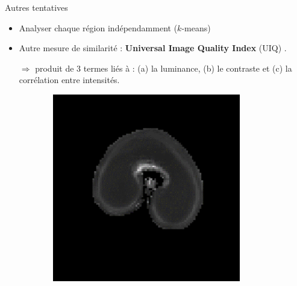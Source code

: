 \documentclass[10pt]{beamer}
\begin{document}
\begin{frame}{Autres tentatives}

  

  \begin{itemize}
  \item Analyser chaque région indépendamment ($k$-means)
  \item  Autre mesure de similarité : \textbf{Universal Image Quality Index} (UIQ) \cite{Zhou_Wang_2002}.
    
  $\Rightarrow$ produit de 3 termes liés à : (a) la luminance, (b) le contraste et (c) la corrélation entre intensités.
\end{itemize}

    \begin{figure}[ht]
    \centering
    \begin{subfigure}[t]{0.31\textwidth}
      \centering
      \includegraphics[width=0.9\textwidth]{fig/mri_slice8_250}
      \caption{}
      \label{subfig:mri_slice8_250}
    \end{subfigure}%
    \begin{subfigure}[t]{0.31\textwidth}
      \centering

\end{subfigure}
\end{figure}
\end{frame}
\end{document}
